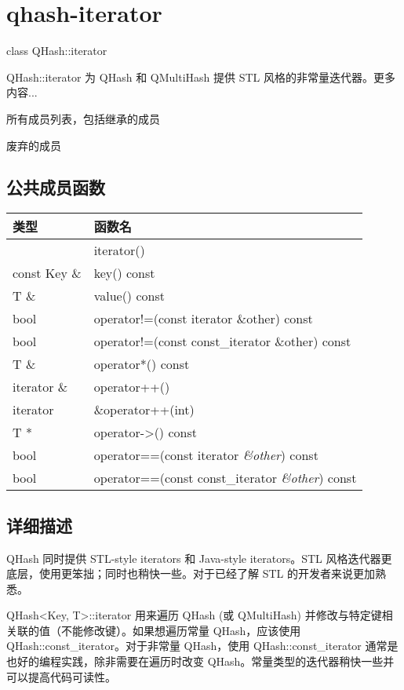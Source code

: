 \chapter{qhash-iterator}

class QHash::iterator

QHash::iterator 为 QHash 和 QMultiHash 提供 STL 风格的非常量迭代器。更多内容...


\begin{compactitem}
\item 所有成员列表，包括继承的成员
\item 废弃的成员
\end{compactitem}

\splitLine

\section{公共成员函数}

\begin{tabular}{|l|l|}
\hline
类型	&函数名\\
\hline
& iterator()\\
\hline
const Key \& &	key() const\\
\hline
T \& &	value() const\\
\hline
bool	& operator!=(const iterator \&other) const\\
\hline
bool	& operator!=(const const\_iterator \&other) const\\
\hline
T \& & 	operator*() const\\
\hline
iterator \&	&operator++()\\
\hline
iterator	&\&operator++(int)\\
\hline
T *	& operator->() const\\
\hline
bool&	operator==(const iterator \emph{\&other}) const\\
\hline
bool&	operator==(const const\_iterator \emph{\&other}) const\\
\hline
\end{tabular}


\splitLine

\section{详细描述}

QHash 同时提供 STL-style iterators 和 Java-style iterators。STL 风格迭代器更底层，使用更笨拙；同时也稍快一些。对于已经了解 STL 的开发者来说更加熟悉。

QHash<Key, T>::iterator 用来遍历 QHash (或 QMultiHash) 并修改与特定键相关联的值（不能修改键）。如果想遍历常量 QHash，应该使用 QHash::const\_iterator。对于非常量 QHash，使用 QHash::const\_iterator 通常是也好的编程实践，除非需要在遍历时改变 QHash。常量类型的迭代器稍快一些并可以提高代码可读性。

